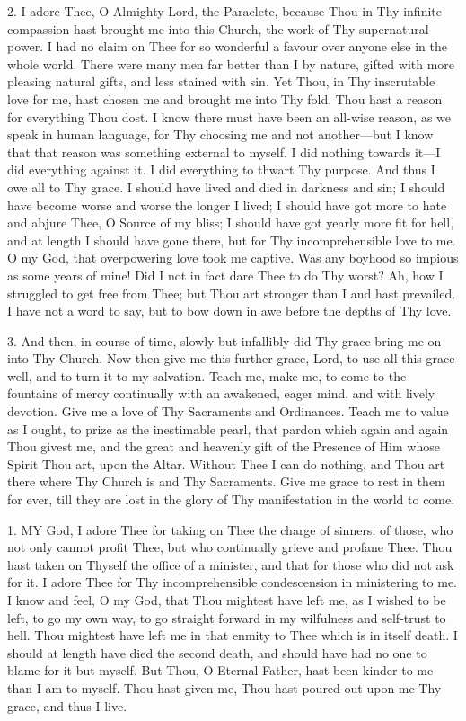 2. I adore Thee, O Almighty
Lord, the Paraclete, because Thou in Thy infinite compassion hast
brought me into this Church, the work of Thy supernatural power. I had
no claim on Thee for so wonderful a favour over anyone else in the whole
world. There were many men far better than I by nature, gifted with more
pleasing natural gifts, and less stained with sin. Yet Thou, in Thy
inscrutable love for me, hast chosen me and brought me into Thy fold.
Thou hast a reason for everything Thou dost. I know there must have been
an all-wise reason, as we speak in human language, for Thy choosing me
and not another—but I know that that reason was something external to
myself. I did nothing towards it—I did everything against it. I did
everything to thwart Thy purpose. And thus I owe all to Thy grace. I
should have lived and died in darkness and sin; I should have become
worse and worse the longer I lived; I should have got more to hate and
abjure Thee, O Source of my bliss; I should have got yearly more fit for
hell, and at length I should have gone there, but for Thy
incomprehensible love to me. O my God, that overpowering love took me
captive. Was any boyhood so impious as some years of mine! Did I not in
fact dare Thee to do Thy worst? Ah, how I struggled to get free from
Thee; but Thou art stronger than I and hast prevailed. I have not
a word to say, but to bow down in awe before the depths of Thy love.

3. And then, in course of time,
slowly but infallibly did Thy grace bring me on into Thy Church. Now
then give me this further grace, Lord, to use all this grace well, and
to turn it to my salvation. Teach me, make me, to come to the fountains
of mercy continually with an awakened, eager mind, and with lively
devotion. Give me a love of Thy Sacraments and Ordinances. Teach me to
value as I ought, to prize as the inestimable pearl, that pardon which
again and again Thou givest me, and the great and heavenly gift of the
Presence of Him whose Spirit Thou art, upon the Altar. Without Thee I
can do nothing, and Thou art there where Thy Church is and Thy
Sacraments. Give me grace to rest in them for ever, till they are lost
in the glory of Thy manifestation in the world to come.


1. MY
God, I adore Thee for taking on Thee the charge of sinners; of those,
who not only cannot profit Thee, but who continually grieve and profane
Thee. Thou hast taken on Thyself the office of a minister, and that for
those who did not ask for it. I adore Thee for Thy incomprehensible
condescension in ministering to me. I know and feel, O my God, that Thou
mightest have left me, as I wished to be left, to go my own way,
to go straight forward in my wilfulness and self-trust to hell. Thou
mightest have left me in that enmity to Thee which is in itself death. I
should at length have died the second death, and should have had no one
to blame for it but myself. But Thou, O Eternal Father, hast been kinder
to me than I am to myself. Thou hast given me, Thou hast poured out upon
me Thy grace, and thus I live.


